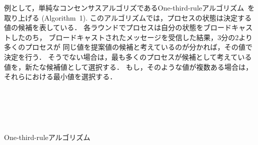 \documentclass[technicalreport]{ieicej}
\theoremstyle{plain}
\begin{document}
例として，単純なコンセンサスアルゴリズであるOne-third-ruleアルゴリズム~\cite{HOjournal}を取り上げる (Algorithm~1). 
このアルゴリズムでは，プロセスの状態は決定する値の候補を表している．
各ラウンドでプロセスは自分の状態をブロードキャストしたのち，
ブロードキャストされたメッセージを受信した結果，3分の2より多くのプロセスが
同じ値を提案値の候補と考えているのが分かれば，その値で決定を行う．
そうでない場合は，最も多くのプロセスが候補として考えている値を，新たな候補値として選択する．
もし，そのような値が複数ある場合は，それらにおける最小値を選択する．
\begin{algorithm}[ht]
    \normalsize{
        \begin{distribalgo}[1]
           
             \\ 
            \ENDINDENT 
            \BLANK
            
             \\
             \\
{}
\ENDIF
            \ENDIF

            \ENDINDENT
            \caption{One-third-ruleアルゴリズム}
            \label{algo:bakery}
        \end{distribalgo}
    }
\end{algorithm}

\end{document}
